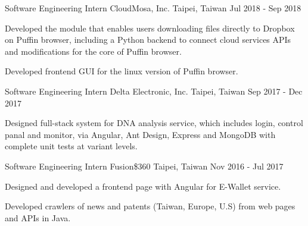 \begin{cventries}
  \cventry
    {Software Engineering Intern} %
    {CloudMosa, Inc.} %
    {Taipei, Taiwan} %
    {Jul 2018 - Sep 2018} %
    {
      \begin{cvitems} %
        \item {Developed the module that enables users downloading files directly to Dropbox on Puffin browser,
        including a Python backend to connect cloud services APIs and modifications for the core of Puffin browser.}
        \item {Developed frontend GUI for the linux version of Puffin browser.}
      \end{cvitems}
    }

  \cventry
    {Software Engineering Intern} %
    {Delta Electronic, Inc.} %
    {Taipei, Taiwan} %
    {Sep 2017 - Dec 2017} %
    {
      \begin{cvitems} %
        \item {Designed full-stack system for DNA analysis service, which includes login, control panal and monitor,
        via Angular, Ant Design, Express and MongoDB with complete unit tests at variant levels.}
      \end{cvitems}
    }

  \cventry
    {Software Engineering Intern} %
    {Fusion\$360} %
    {Taipei, Taiwan} %
    {Nov 2016 - Jul 2017} %
    {
      \begin{cvitems} %
        \item {Designed and developed a frontend page with Angular for E-Wallet service.}
        \item {Developed crawlers of news and patents (Taiwan, Europe, U.S) from web pages and APIs in Java.}
      \end{cvitems}
    }

\end{cventries}
